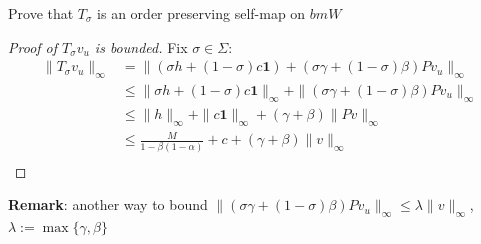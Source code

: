 \documentclass[aspectratio=169]{beamer} %
\begin{document}
\begin{frame}{Prove that $T_\sigma$ is an order preserving self-map on $bmW$}
\begin{proof}[Proof of $T_\sigma v_u$ is bounded]
   Fix $\sigma\in\Sigma$:
    \begin{align*}
        \|T_\sigma v_u\|_\infty &= \|(\sigma h+(1-\sigma )c\mathbf{1}) + (\sigma \gamma+(1-\sigma)\beta)Pv_u\|_\infty\\
        &\le \|\sigma h+(1-\sigma )c\mathbf{1}\|_\infty + \|(\sigma \gamma+(1-\sigma)\beta)Pv_u\|_\infty \tag{$\Delta$ ineq.}\\
        &\le \|h\|_\infty +\|c\mathbf{1}\|_\infty  + (\gamma+\beta)\|Pv\|_\infty \tag{$\Delta$ ineq.}\\
        &\le \frac{M}{1-\beta(1-\alpha)} + c+ (\gamma+\beta)\|v\|_\infty\tag{$\|P\|=1$}\\
    \end{align*}
\end{proof}
\textbf{Remark}: another way to bound $\|(\sigma \gamma+(1-\sigma)\beta)Pv_u\|_\infty\le \lambda \|v\|_\infty$, $\lambda:=\max\{\gamma,\beta\}$
\end{frame}
\end{document}
